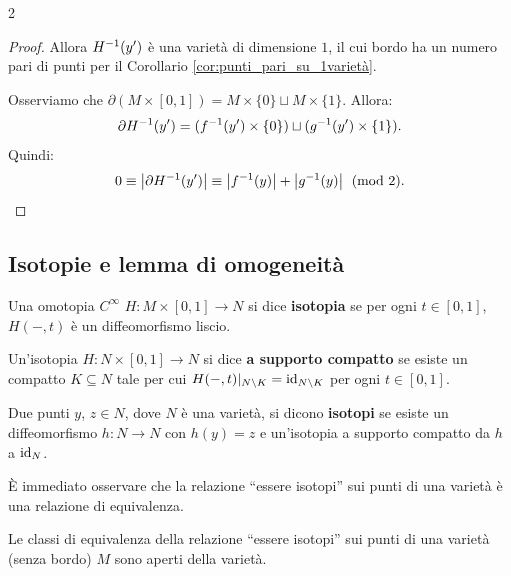 \begin{multicols*}{2}
\begin{proof}
        Allora $H^{-1}(y')$ è una varietà di dimensione $1$, il cui bordo ha un numero pari
        di punti per il Corollario \ref{cor:punti_pari_su_1varietà}. \smallskip

        Osserviamo che $\partial (M \times [0, 1]) = M \times \{0\} \sqcup M \times \{1\}$. Allora:
        \[
            \partial H^{-1}(y') = (f^{-1}(y') \times \{0\}) \sqcup (g^{-1}(y') \times \{1\}).
        \]
        Quindi:
        \[
            0 \equiv \left\lvert \partial H^{-1}(y') \right\rvert \equiv \left\lvert f^{-1}(y) \right\rvert + \left\lvert g^{-1}(y) \right\rvert \pmod{2}.
        \]
    \end{proof}

    \subsection{Isotopie e lemma di omogeneità}

    \begin{definition}[Isotopia]
        Una omotopia $C^\infty$ $H : M \times [0, 1] \to N$ si dice
        \textbf{isotopia} se per ogni $t \in [0, 1]$, $H(-, t)$ è un
        diffeomorfismo liscio.
    \end{definition}

    \begin{definition}
        Un'isotopia $H : N \times [0, 1] \to N$ si dice \textbf{a supporto compatto} se esiste
        un compatto $K \subseteq N$ tale per cui $H(-, t)\arrowvert_{N \setminus K} = \operatorname{id}_{N \setminus K}$
        per ogni $t \in [0, 1]$.
    \end{definition}

    \begin{definition}
        Due punti $y$, $z \in N$, dove $N$ è una varietà, si dicono
        \textbf{isotopi} se esiste un diffeomorfismo $h : N \to N$
        con $h(y) = z$ e un'isotopia a supporto compatto da $h$ a
        $\operatorname{id}_{N}$.
    \end{definition}

    \begin{remark}
        È immediato osservare che la relazione ``essere isotopi'' sui punti di una varietà è una relazione di equivalenza.
    \end{remark}

    \begin{lemma} \label{lem:classi_equivalenza_aperte}
        Le classi di equivalenza della relazione ``essere isotopi'' sui
        punti di una varietà (senza bordo) $M$ sono aperti della varietà.
    \end{lemma}


\end{multicols*}
